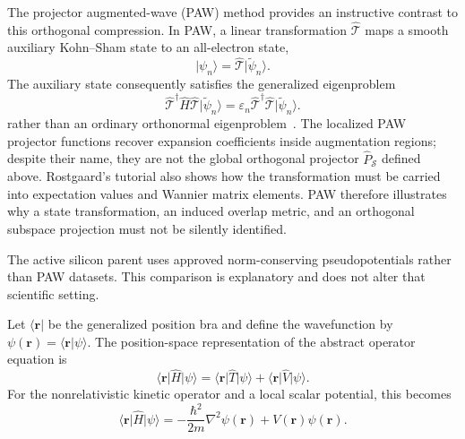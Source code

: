 The projector augmented-wave (PAW) method provides
 an instructive contrast to
this orthogonal compression. In PAW, a linear transformation
$\hat{\mathcal T}$ maps a smooth auxiliary Kohn--Sham state to an all-electron
state,
\begin{equation}
    \lvert\psi_n\rangle
    =
    \hat{\mathcal T}\lvert\widetilde\psi_n\rangle.
\end{equation}
The auxiliary state consequently satisfies the generalized eigenproblem
\begin{equation}
    \hat{\mathcal T}^{\dagger}\hat H\hat{\mathcal T}
    \lvert\widetilde\psi_n\rangle
    =
    \varepsilon_n
    \hat{\mathcal T}^{\dagger}\hat{\mathcal T}
    \lvert\widetilde\psi_n\rangle.
\end{equation}
rather than an ordinary orthonormal eigenproblem~\cite{rostgaard2009}. The
localized PAW projector functions recover expansion coefficients inside
augmentation regions; despite their name, they are not the global orthogonal
projector $\hat P_{\mathcal S}$ defined above. Rostgaard's tutorial also shows
how the transformation must be carried into expectation values and Wannier
matrix elements. PAW therefore illustrates why a state transformation, an
induced overlap metric, and an orthogonal subspace projection must not be
silently identified.

The active silicon parent uses approved norm-conserving pseudopotentials rather
than PAW datasets. This comparison is explanatory and does not alter that
scientific setting.


\begin{definition}

Let $\langle\mathbf r\rvert$ be the generalized position bra and define the
wavefunction by
$\psi(\mathbf r)=\langle\mathbf r\vert\psi\rangle$. The position-space
representation of the abstract operator equation is
\begin{equation}
    \langle\mathbf r\rvert\hat H\lvert\psi\rangle
    =
    \langle\mathbf r\rvert\hat T\lvert\psi\rangle
    +
    \langle\mathbf r\rvert\hat V\lvert\psi\rangle.
\end{equation}
For the nonrelativistic kinetic operator and a local scalar potential, this
becomes
\begin{equation}
    \langle\mathbf r\rvert\hat H\lvert\psi\rangle
    =
    -\frac{\hbar^{2}}{2m}\nabla^{2}\psi(\mathbf r)
    +V(\mathbf r)\psi(\mathbf r).
\end{equation}
\end{definition}

